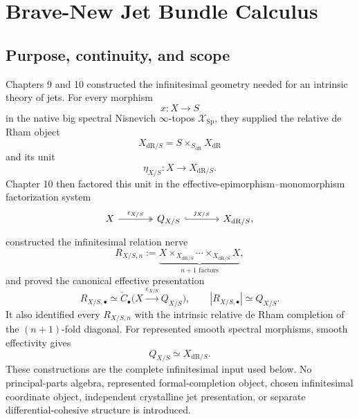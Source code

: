 \providecommand{\XSp}{\mathcal{X}_{\mathrm{Sp}}}
\providecommand{\dR}{\mathrm{dR}}
\providecommand{\Jinf}{J^{\infty}}
\providecommand{\Tinf}{T^{\infty}}
\providecommand{\PDE}{\operatorname{PDE}}
\providecommand{\Diff}{\operatorname{Diff}}
\providecommand{\Coalg}{\operatorname{Coalg}}
\providecommand{\coKl}{\operatorname{coKl}}
\providecommand{\Map}{\operatorname{Map}}
\providecommand{\Sol}{\operatorname{Sol}}
\providecommand{\Eq}{\operatorname{Eq}}
\providecommand{\id}{\operatorname{id}}
\providecommand{\pr}{\operatorname{pr}}
\providecommand{\fib}{\operatorname{fib}}
\providecommand{\Dred}{D_{\mathrm{red}}}

\chapter{Brave-New Jet Bundle Calculus}
\label{chap:brave-new-jets}

\section{Purpose, continuity, and scope}
\label{sec:jets-purpose}

Chapters 9 and 10 constructed the infinitesimal geometry needed for an intrinsic theory of jets.  For every morphism
\[
    x:X\longrightarrow S
\]
in the native big spectral Nisnevich $\infty$-topos $\XSp$, they supplied the relative de Rham object
\[
    X_{\dR/S}=S\times_{S_{\dR}}X_{\dR}
\]
and its unit
\[
    \eta_{X/S}:X\longrightarrow X_{\dR/S}.
\]
Chapter 10 then factored this unit in the effective-epimorphism--monomorphism factorization system
\[
\begin{tikzcd}[column sep=large]
X \arrow[r, two heads, "\epsilon_{X/S}"]
  & Q_{X/S} \arrow[r, hook, "\jmath_{X/S}"]
  & X_{\dR/S},
\end{tikzcd}
\]
constructed the infinitesimal relation nerve
\[
R_{X/S,n}
 :=
 \underbrace{X\times_{X_{\dR/S}}\cdots\times_{X_{\dR/S}}X}_{n+1\text{ factors}},
\]
and proved the canonical effective presentation
\[
    R_{X/S,\bullet}
    \simeq
    \check C_\bullet\bigl(X\xrightarrow{\epsilon_{X/S}}Q_{X/S}\bigr),
    \qquad
    |R_{X/S,\bullet}|\simeq Q_{X/S}.
\]
It also identified every $R_{X/S,n}$ with the intrinsic relative de Rham completion of the $(n+1)$-fold diagonal.  For represented smooth spectral morphisms, smooth effectivity gives
\[
    Q_{X/S}\simeq X_{\dR/S}.
\]
These constructions are the complete infinitesimal input used below.  No principal-parts algebra, represented formal-completion object, chosen infinitesimal coordinate object, independent crystalline jet presentation, or separate differential-cohesive structure is introduced.

